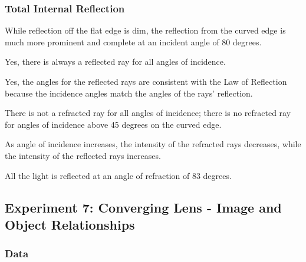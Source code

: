 \documentclass[12pt]{article}
\begin{document}
\subsubsection{Total Internal Reflection}

\subsubsubsection{}

While reflection off the flat edge is dim, the reflection from the curved edge
is much more prominent and complete at an incident angle of 80 degrees.

\subsubsubsection{}

Yes, there is always a reflected ray for all angles of incidence.

\subsubsubsection{}

Yes, the angles for the reflected rays are consistent with the Law of Reflection
because the incidence angles match the angles of the rays' reflection.

\subsubsubsection{}

There is not a refracted ray for all angles of incidence; there is no refracted
ray for angles of incidence above 45 degrees on the curved edge.

\subsubsubsection{}

As angle of incidence increases, the intensity of the refracted rays decreases,
while the intensity of the reflected rays increases.

\subsubsubsection{}

All the light is reflected at an angle of refraction of 83 degrees.



\subsection{Experiment 7: Converging Lens - Image and Object Relationships}

\subsubsection{Data}
\end{document}
